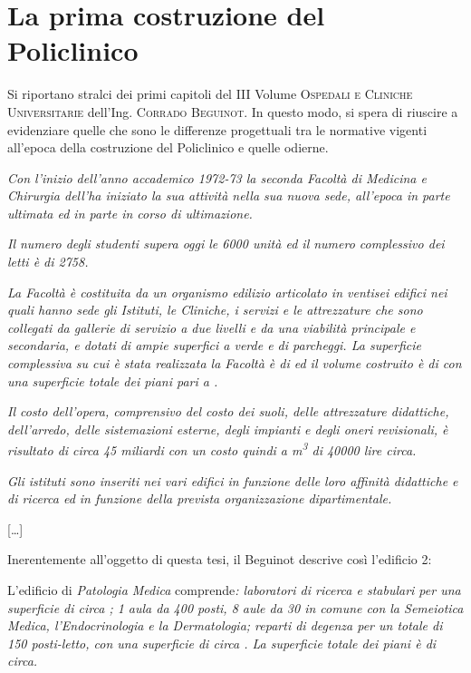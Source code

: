 \chapter{La prima costruzione del Policlinico}
\thispagestyle{empty}
Si riportano stralci dei primi capitoli del III Volume \textsc{Ospedali e Cliniche Universitarie} dell'Ing. \textsc{Corrado Beguinot}. In questo modo, si spera di riuscire a evidenziare quelle che sono le differenze progettuali tra le normative vigenti all'epoca della costruzione del Policlinico e quelle odierne.\vspace{0.5em}
 
\emph{Con l'inizio dell'anno accademico 1972-73 la seconda Facoltà di Medicina e Chirurgia dell'\uni ha iniziato la sua attività nella sua nuova sede, all'epoca in parte ultimata ed in parte in corso di ultimazione.}

\emph{Il numero degli studenti supera oggi le \num{6000} unità ed il numero complessivo dei letti è di \num{2758}.}

\emph{La Facoltà è costituita da un organismo edilizio articolato in ventisei edifici nei quali hanno sede gli Istituti, le Cliniche, i servizi e le attrezzature che sono collegati da gallerie di servizio a due livelli e da una viabilità principale e secondaria, e dotati di ampie superfici a verde e di parcheggi. La superficie complessiva su cui è stata realizzata la Facoltà è di  ed il volume costruito è di  con una superficie totale dei piani pari a .}

\emph{Il costo dell'opera, comprensivo del costo dei suoli, delle attrezzature didattiche, dell'arredo, delle sistemazioni esterne, degli impianti e degli oneri revisionali, è risultato di circa \num{45} miliardi con un costo quindi a \si{m^3} di \num{40000} lire circa.}

\emph{Gli istituti sono inseriti nei vari edifici in funzione delle loro affinità didattiche e di ricerca ed in funzione della prevista organizzazione dipartimentale.}

\vspace{0.5em}

[\dots]

\vspace{0.5em}
\noindent Inerentemente all'oggetto di questa tesi, il Beguinot descrive così l'edificio 2:

\vspace{0.5em}

L'edificio di \emph{Patologia Medica} comprende\emph{: laboratori di ricerca e stabulari per una superficie di circa ; 1 aula da \num{400} posti, \num{8} aule da \num{30} in comune con la Semeiotica Medica, l'Endocrinologia e la Dermatologia; reparti di degenza per un totale di \num{150} posti-letto, con una superficie di circa . La superficie totale dei piani è di  circa.}


